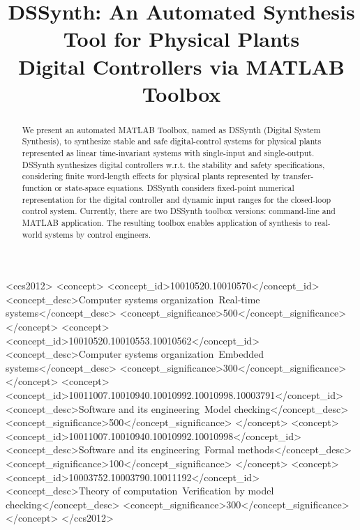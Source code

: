 \documentclass[sigconf]{acmart}
\begin{document}
\title{DSSynth: An Automated Synthesis Tool for Physical Plants \\ Digital Controllers via MATLAB Toolbox}

\begin{abstract}
We present an automated MATLAB Toolbox, named as DSSynth 
(Digital System Synthesis), to synthesize stable and safe digital-control 
systems for physical plants represented as linear time-invariant
systems with single-input and single-output. DSSynth synthesizes digital 
controllers w.r.t. the stability and safety specifications, considering finite word-length 
effects for physical plants represented by transfer-function or state-space 
equations. DSSynth considers fixed-point numerical representation for the 
digital controller and dynamic input ranges for the closed-loop control system. 
Currently, there are two DSSynth toolbox versions: command-line and 
MATLAB application. The resulting toolbox enables application of synthesis to 
real-world systems by control engineers.
\end{abstract}

%
%
\begin{CCSXML}
<ccs2012>
<concept>
<concept_id>10010520.10010570</concept_id>
<concept_desc>Computer systems organization~Real-time systems</concept_desc>
<concept_significance>500</concept_significance>
</concept>
<concept>
<concept_id>10010520.10010553.10010562</concept_id>
<concept_desc>Computer systems organization~Embedded systems</concept_desc>
<concept_significance>300</concept_significance>
</concept>
<concept>
<concept_id>10011007.10010940.10010992.10010998.10003791</concept_id>
<concept_desc>Software and its engineering~Model checking</concept_desc>
<concept_significance>500</concept_significance>
</concept>
<concept>
<concept_id>10011007.10010940.10010992.10010998</concept_id>
<concept_desc>Software and its engineering~Formal methods</concept_desc>
<concept_significance>100</concept_significance>
</concept>
<concept>
<concept_id>10003752.10003790.10011192</concept_id>
<concept_desc>Theory of computation~Verification by model checking</concept_desc>
<concept_significance>300</concept_significance>
</concept>
</ccs2012>
\end{CCSXML}

\end{document}
